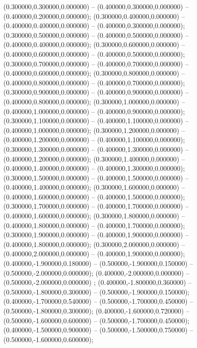  (0.300000,0.300000,0.000000) -- (0.400000,0.300000,0.000000) -- (0.400000,0.200000,0.000000);
 (0.300000,0.400000,0.000000) -- (0.400000,0.400000,0.000000) -- (0.400000,0.300000,0.000000);
 (0.300000,0.500000,0.000000) -- (0.400000,0.500000,0.000000) -- (0.400000,0.400000,0.000000);
 (0.300000,0.600000,0.000000) -- (0.400000,0.600000,0.000000) -- (0.400000,0.500000,0.000000);
 (0.300000,0.700000,0.000000) -- (0.400000,0.700000,0.000000) -- (0.400000,0.600000,0.000000);
 (0.300000,0.800000,0.000000) -- (0.400000,0.800000,0.000000) -- (0.400000,0.700000,0.000000);
 (0.300000,0.900000,0.000000) -- (0.400000,0.900000,0.000000) -- (0.400000,0.800000,0.000000);
 (0.300000,1.000000,0.000000) -- (0.400000,1.000000,0.000000) -- (0.400000,0.900000,0.000000);
 (0.300000,1.100000,0.000000) -- (0.400000,1.100000,0.000000) -- (0.400000,1.000000,0.000000);
 (0.300000,1.200000,0.000000) -- (0.400000,1.200000,0.000000) -- (0.400000,1.100000,0.000000);
 (0.300000,1.300000,0.000000) -- (0.400000,1.300000,0.000000) -- (0.400000,1.200000,0.000000);
 (0.300000,1.400000,0.000000) -- (0.400000,1.400000,0.000000) -- (0.400000,1.300000,0.000000);
 (0.300000,1.500000,0.000000) -- (0.400000,1.500000,0.000000) -- (0.400000,1.400000,0.000000);
 (0.300000,1.600000,0.000000) -- (0.400000,1.600000,0.000000) -- (0.400000,1.500000,0.000000);
 (0.300000,1.700000,0.000000) -- (0.400000,1.700000,0.000000) -- (0.400000,1.600000,0.000000);
 (0.300000,1.800000,0.000000) -- (0.400000,1.800000,0.000000) -- (0.400000,1.700000,0.000000);
 (0.300000,1.900000,0.000000) -- (0.400000,1.900000,0.000000) -- (0.400000,1.800000,0.000000);
 (0.300000,2.000000,0.000000) -- (0.400000,2.000000,0.000000) -- (0.400000,1.900000,0.000000);
 (0.400000,-1.900000,0.180000) -- (0.500000,-1.900000,0.150000) -- (0.500000,-2.000000,0.000000);
 (0.400000,-2.000000,0.000000) -- (0.500000,-2.000000,0.000000) ;
 (0.400000,-1.800000,0.360000) -- (0.500000,-1.800000,0.300000) -- (0.500000,-1.900000,0.150000);
 (0.400000,-1.700000,0.540000) -- (0.500000,-1.700000,0.450000) -- (0.500000,-1.800000,0.300000);
 (0.400000,-1.600000,0.720000) -- (0.500000,-1.600000,0.600000) -- (0.500000,-1.700000,0.450000);
 (0.400000,-1.500000,0.900000) -- (0.500000,-1.500000,0.750000) -- (0.500000,-1.600000,0.600000);
